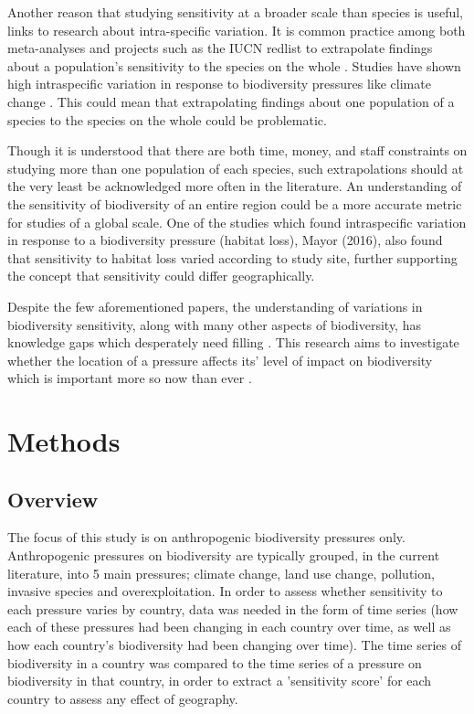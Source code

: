 \documentclass[11pt, a4paper, titlepage]{article}
\begin{document}
	Another reason that studying sensitivity at a broader scale than species is useful, links to research about intra-specific variation. It is common practice among both meta-analyses and projects such as the IUCN redlist to extrapolate findings about a population's sensitivity to the species on the whole \citep{iucn2001iucn} \citep{buckley2012functional}. Studies have shown high intraspecific variation in response to biodiversity pressures like climate change \citep{mclean2018high} \citep{both2004large} \citep{mayor2016assessing}. This could mean that extrapolating findings about one population of a species to the species on the whole could be problematic. \newline
	
	Though it is understood that there are both time, money, and staff constraints on studying more than one population of each species, such extrapolations should at the very least be acknowledged more often in the literature. An understanding of the sensitivity of biodiversity of an entire region could be a more accurate metric for studies of a global scale. One of the studies which found intraspecific variation in response to a biodiversity pressure (habitat loss), Mayor (2016), also found that sensitivity to habitat loss varied according to study site, further supporting the concept that sensitivity could differ geographically. \newline
	
	Despite the few aforementioned papers, the understanding of variations in biodiversity sensitivity, along with many other aspects of biodiversity, has knowledge gaps which desperately need filling \citep{pereira2012global}. This research aims to investigate whether the location of a pressure affects its' level of impact on biodiversity which is important more so now than ever \citep{ceballos2015accelerated}. \newline


    \section*{Methods}

	\subsection*{Overview}

	The focus of this study is on anthropogenic biodiversity pressures only. Anthropogenic pressures on biodiversity are typically grouped, in the current literature, into 5 main pressures; climate change, land use change, pollution, invasive species and overexploitation. In order to assess whether sensitivity to each pressure varies by country, data was needed in the form of time series (how each of these pressures had been changing in each country over time, as well as how each country's biodiversity had been changing over time). The time series of biodiversity in a country was compared to the time series of a pressure on biodiversity in that country, in order to extract a 'sensitivity score' for each country to assess any effect of geography. \newline
	
\end{document}
